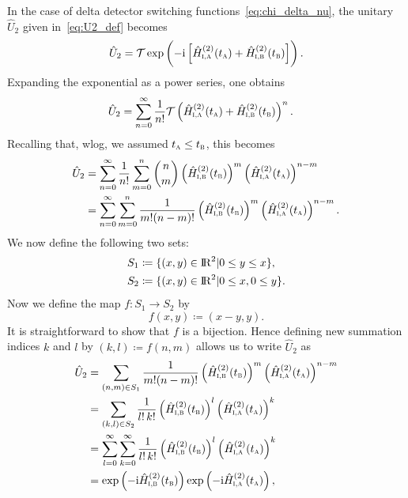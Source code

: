\documentclass[pra,nofootinbib,floats,aps,twocolumn,tightenlines,superscriptaddress]{revtex4-1}
\newcommand{\ii}{\mathrm{i}}
\begin{document}
In the case of delta detector switching functions~\eqref{eq:chi_delta_nu}, the unitary $\hat{U}_2$ given in~\eqref{eq:U2_def} becomes
\begin{align}
    \hat{U}_2
    =
    \mathcal{T}
    \exp
    \left(
    -\ii 
    \left[
    \hat{H}_\textsc{i,a}^{(2)}(t_\textsc{a})
    +\hat{H}_\textsc{i,b}^{(2)}(t_\textsc{b})
    \right]
    \right).
\end{align}
Expanding the exponential as a power series, one obtains
\begin{align}
    \hat{U}_2
    &=
    \sum_{n=0}^\infty
    \frac{1}{n!}
    \mathcal{T}
    \left(
    \hat{H}_\textsc{i,a}^{(2)}(t_\textsc{a})
    +\hat{H}_\textsc{i,b}^{(2)}(t_\textsc{b})
    \right)^n.
\end{align}
Recalling that, wlog, we assumed $t_\textsc{a}\le t_\textsc{b}$, this becomes
\begin{align}
    \hat{U}_2
    &=
    \sum_{n=0}^\infty
    \frac{1}{n!}
    \sum_{m=0}^n
    \binom{n}{m}
    \left(
    \hat{H}_\textsc{i,b}^{(2)}(t_\textsc{b})
    \right)^m
    \left(
    \hat{H}_\textsc{i,a}^{(2)}(t_\textsc{a})
    \right)^{n-m}
    \notag\\
    &=
    \sum_{n=0}^\infty
    \sum_{m=0}^n
    \frac{1}{m!(n-m)!}
    \left(
    \hat{H}_\textsc{i,b}^{(2)}(t_\textsc{b})
    \right)^m
    \left(
    \hat{H}_\textsc{i,a}^{(2)}(t_\textsc{a})
    \right)^{n-m}.
\end{align}
We now define the following two sets:
\begin{align}
    S_1
    &\coloneqq
    \{
    (x,y)\in{\rm I\!R}^2|0\le y\le x
    \},
    \\
    S_2
    &\coloneqq
    \{
    (x,y)\in{\rm I\!R}^2|0\le x,0\le y
    \}.
\end{align}
Now we define the map $f:S_1\rightarrow S_2$ by
\begin{equation}
    f(x,y)\coloneqq (x-y,y).
\end{equation}
It is straightforward to show that $f$ is a bijection. Hence defining new summation indices $k$ and $l$ by \mbox{$(k,l)\coloneqq f(n,m)$} allows us to write $\hat{U}_2$ as
\begin{align}
    \hat{U}_2
    &=
    \sum_{(n,m)\in S_1}
    \frac{1}{m!(n-m)!}
    \left(
    \hat{H}_\textsc{i,b}^{(2)}(t_\textsc{b})
    \right)^m
    \left(
    \hat{H}_\textsc{i,a}^{(2)}(t_\textsc{a})
    \right)^{n-m}
    \notag\\
    &=
    \sum_{(k,l)\in S_2}
    \frac{1}{l!\,k!}
    \left(
    \hat{H}_\textsc{i,b}^{(2)}(t_\textsc{b})
    \right)^l
    \left(
    \hat{H}_\textsc{i,a}^{(2)}(t_\textsc{a})
    \right)^k
    \notag\\
    &=
    \sum_{l=0}^\infty
    \sum_{k=0}^\infty
    \frac{1}{l!\,k!}
    \left(
    \hat{H}_\textsc{i,b}^{(2)}(t_\textsc{b})
    \right)^l
    \left(
    \hat{H}_\textsc{i,a}^{(2)}(t_\textsc{a})
    \right)^k
    \notag\\
    &=
    \exp
    \left(-\ii 
    \hat{H}_\textsc{i,b}^{(2)}(t_\textsc{b})
    \right)
    \exp
    \left(-\ii 
    \hat{H}_\textsc{i,a}^{(2)}(t_\textsc{a})
    \right),
\end{align}
\end{document}
